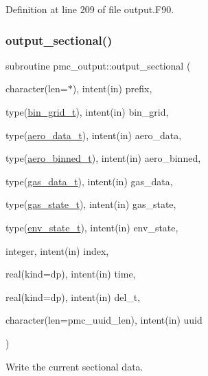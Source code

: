Definition at line 209 of file output.\+F90.

\mbox{\label{namespacepmc__output_aaeb4ae95909c840a46222d7a1183014c}} 
\subsubsection{\texorpdfstring{output\+\_\+sectional()}{output\_sectional()}}
{\footnotesize\ttfamily subroutine pmc\+\_\+output\+::output\+\_\+sectional (\begin{DoxyParamCaption}\item[{character(len=$\ast$), intent(in)}]{prefix,  }\item[{type(\mbox{\hyperlink{structpmc__bin__grid_1_1bin__grid__t}{bin\+\_\+grid\+\_\+t}}), intent(in)}]{bin\+\_\+grid,  }\item[{type(\mbox{\hyperlink{structpmc__aero__data_1_1aero__data__t}{aero\+\_\+data\+\_\+t}}), intent(in)}]{aero\+\_\+data,  }\item[{type(\mbox{\hyperlink{structpmc__aero__binned_1_1aero__binned__t}{aero\+\_\+binned\+\_\+t}}), intent(in)}]{aero\+\_\+binned,  }\item[{type(\mbox{\hyperlink{structpmc__gas__data_1_1gas__data__t}{gas\+\_\+data\+\_\+t}}), intent(in)}]{gas\+\_\+data,  }\item[{type(\mbox{\hyperlink{structpmc__gas__state_1_1gas__state__t}{gas\+\_\+state\+\_\+t}}), intent(in)}]{gas\+\_\+state,  }\item[{type(\mbox{\hyperlink{structpmc__env__state_1_1env__state__t}{env\+\_\+state\+\_\+t}}), intent(in)}]{env\+\_\+state,  }\item[{integer, intent(in)}]{index,  }\item[{real(kind=dp), intent(in)}]{time,  }\item[{real(kind=dp), intent(in)}]{del\+\_\+t,  }\item[{character(len=pmc\+\_\+uuid\+\_\+len), intent(in)}]{uuid }\end{DoxyParamCaption})}



Write the current sectional data. 



